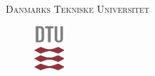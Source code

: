 \begin{titlepage}
\begin{center}
\textsc{\LARGE Danmarks Tekniske Universitet}\\[1.5cm]
\begin{figure}[h]
\centering
\includegraphics[width=0.10\textwidth]{Bilag/Pics/DTU-logo.png}~\\[1cm]
\end{figure}

\end{center}
\end{titlepage}
